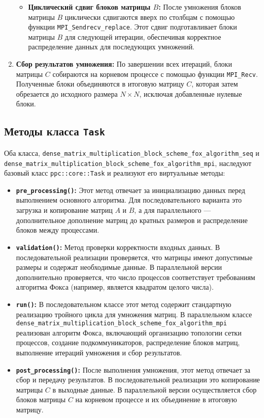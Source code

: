 \documentclass{report}
\begin{document}
\begin{enumerate}
\begin{itemize}
        \item \textbf{Циклический сдвиг блоков матрицы $B$:} После умножения блоков матрицы $B$ циклически сдвигаются вверх по столбцам с помощью функции \texttt{MPI\_Sendrecv\_replace}. Этот сдвиг подготавливает блоки матрицы $B$ для следующей итерации, обеспечивая корректное распределение данных для последующих умножений.
    \end{itemize}
    
    \item \textbf{Сбор результатов умножения:} По завершении всех итераций, блоки матрицы $C$ собираются на корневом процессе с помощью функции \texttt{MPI\_Recv}. Полученные блоки объединяются в итоговую матрицу $C$, которая затем обрезается до исходного размера $N \times N$, исключая добавленные нулевые блоки.
\end{enumerate}

\subsection*{Методы класса \texttt{Task}}

Оба класса, \texttt{dense\_matrix\_multiplication\_block\_scheme\_fox\_algorithm\_seq} и \texttt{dense\_matrix\_multiplication\_block\_scheme\_fox\_algorithm\_mpi}, наследуют базовый класс \texttt{ppc::core::Task} и реализуют его виртуальные методы:

\begin{itemize}
    \item \textbf{\texttt{pre\_processing()}:} Этот метод отвечает за инициализацию данных перед выполнением основного алгоритма. Для последовательного варианта это загрузка и копирование матриц $A$ и $B$, а для параллельного — дополнительное дополнение матриц до кратных размеров и распределение блоков между процессами.
    
    \item \textbf{\texttt{validation()}:} Метод проверки корректности входных данных. В последовательной реализации проверяется, что матрицы имеют допустимые размеры и содержат необходимые данные. В параллельной версии дополнительно проверяется, что число процессов соответствует требованиям алгоритма Фокса (например, является квадратом целого числа).
    
    \item \textbf{\texttt{run()}:} В последовательном классе этот метод содержит стандартную реализацию тройного цикла для умножения матриц. В параллельном классе \texttt{dense\_matrix\_multiplication\_block\_scheme\_fox\_algorithm\_mpi} реализован алгоритм Фокса, включающий организацию топологии сетки процессов, создание подкоммуникаторов, распределение блоков матриц, выполнение итераций умножения и сбор результатов.
    
    \item \textbf{\texttt{post\_processing()}:} После выполнения умножения, этот метод отвечает за сбор и передачу результатов. В последовательной реализации это копирование матрицы $C$ в выходные данные. В параллельной версии осуществляется сбор блоков матрицы $C$ на корневом процессе и их объединение в итоговую матрицу.
\end{itemize}
\end{document}
